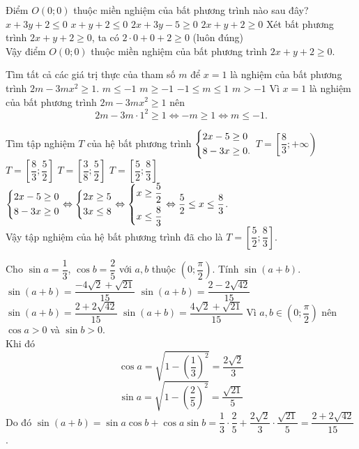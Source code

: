 \begin{ex}%
 Điểm $O(0;0)$ thuộc miền nghiệm của bất phương trình nào sau đây?
 \choice
  {$x + 3y + 2 \leq 0$}
  {$x + y + 2 \leq 0$}
  {$2x + 3y - 5 \geq 0$}
  {\True $2x + y + 2 \geq 0$}
 \loigiai
 {
 Xét bất phương trình $2x + y + 2 \geq 0$, ta có $2 \cdot 0 + 0 + 2 \geq 0$ (luôn đúng)\\
 Vậy điểm $O(0;0)$ thuộc miền nghiệm của bất phương trình  $2x + y + 2 \geq 0$.
 }
\end{ex}


\begin{ex}%
 Tìm tất cả các giá trị thực của tham số $m$ để $x = 1$ là nghiệm của bất phương trình $2m - 3mx^2 \geq 1$.
 \choice
  {\True $m \leq -1$}
  {$m \geq -1$}
  {$-1 \leq m \leq 1$}
  {$m > -1$}
 \loigiai
 {
 Vì $x = 1$ là nghiệm của bất phương trình $2m - 3mx^2 \geq 1$ nên
 $$2m - 3m \cdot 1^2 \geq 1 \Leftrightarrow -m \geq 1 \Leftrightarrow m \leq -1.$$
 }
\end{ex}


\begin{ex}%
 Tìm tập nghiệm $T$ của hệ bất phương trình $\left\{\begin{aligned}& 2x-5 \geq 0 \\& 8-3x \geq 0.\end{aligned}\right.$
 \choice
  {$T = \left[ \dfrac{8}{3}; +\infty \right)$}
  {$T = \left[ \dfrac{8}{3}; \dfrac{5}{2} \right]$}
  {$T = \left[ \dfrac{3}{8}; \dfrac{5}{2} \right]$}
  {\True $T = \left[ \dfrac{5}{2}; \dfrac{8}{3} \right]$}
 \loigiai
 {
  $\left\{\begin{aligned}& 2x-5 \geq 0 \\& 8-3x \geq 0\end{aligned}\right. \Leftrightarrow \left\{\begin{aligned}& 2x \geq 5 \\& 3x \leq 8\end{aligned}\right. \Leftrightarrow  \left\{\begin{aligned}& x \geq \dfrac{5}{2} \\& x \leq \dfrac{8}{3}\end{aligned}\right. \Leftrightarrow \dfrac{5}{2} \leq x \leq \dfrac{8}{3}$.\\
  Vậy tập nghiệm của hệ bất phương trình đã cho là $T = \left[ \dfrac{5}{2}; \dfrac{8}{3} \right]$.
 }
\end{ex}


\begin{ex}%
 Cho $\sin a = \dfrac{1}{3}$, $\cos b = \dfrac{2}{5}$ với $a, b$ thuộc $\left(0; \dfrac{\pi}{2}\right)$. Tính $\sin (a+b)$.
 \choice
  {$\sin (a+b) = \dfrac{-4\sqrt{2} + \sqrt{21}}{15}$}
  {$\sin (a+b) = \dfrac{2 - 2\sqrt{42}}{15}$}
  {\True $\sin (a+b) = \dfrac{2 + 2\sqrt{42}}{15}$}
  {$\sin (a+b) = \dfrac{4\sqrt{2} + \sqrt{21}}{15}$}
 \loigiai
 {
 Vì $a, b \in \left( 0; \dfrac{\pi}{2} \right)$ nên $\cos a > 0$ và $\sin b > 0$.\\
 Khi đó
 $$\cos a = \sqrt{1 - \left( \dfrac{1}{3} \right)^2} = \dfrac{2\sqrt{2}}{3}$$
  $$\sin a = \sqrt{1 - \left( \dfrac{2}{5} \right)^2} = \dfrac{\sqrt{21}}{5}$$
  Do đó $\sin (a + b) = \sin a \cos b + \cos a \sin b = \dfrac{1}{3} \cdot \dfrac{2}{5} + \dfrac{2 \sqrt{2}}{3} \cdot \dfrac{\sqrt{21}}{5} = \dfrac{2 + 2\sqrt{42}}{15}$.
 }
\end{ex}


